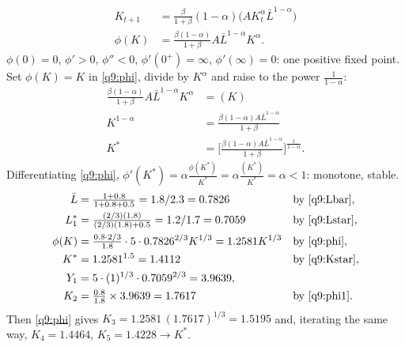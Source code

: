 \begin{sol}
\begin{align}
K_{t+1} &= \frac{\beta}{1+\beta}(1-\alpha)\big(AK_t^\alpha\bar L^{1-\alpha}\big)\nonumber\\
\phi(K) &= \frac{\beta(1-\alpha)}{1+\beta}A\bar L^{1-\alpha}K^\alpha. \label{q9:phi}
\end{align}
$\phi(0)=0$, $\phi'>0$, $\phi''<0$, $\phi'(0^+)=\infty$, $\phi'(\infty)=0$: one positive fixed point. Set $\phi(K)=K$ in \eqref{q9:phi}, divide
by $K^\alpha$ and raise to the power $\frac1{1-\alpha}$:
\begin{align}
\frac{\beta(1-\alpha)}{1+\beta}A\bar L^{1-\alpha}K^\alpha &= (K)\nonumber\\
K^{1-\alpha} &= \frac{\beta(1-\alpha)A\bar L^{1-\alpha}}{1+\beta}\nonumber\\
K^\ast &= \Big[\frac{\beta(1-\alpha)A\bar L^{1-\alpha}}{1+\beta}\Big]^{\frac1{1-\alpha}}. \label{q9:Kstar}
\end{align}
Differentiating \eqref{q9:phi}, $\phi'(K^\ast)=\alpha\frac{\phi(K^\ast)}{K^\ast}=\alpha\frac{(K^\ast)}{K^\ast}=\alpha<1$: monotone, stable.
\begin{align*}
\bar L &= \tfrac{1+0.8}{1+0.8+0.5}=1.8/2.3=0.7826 &&\text{by \eqref{q9:Lbar}},\\
L_1^\ast &= \tfrac{(2/3)(1.8)}{(2/3)(1.8)+0.5}=1.2/1.7=0.7059 &&\text{by \eqref{q9:Lstar}},\\
\phi(K) &= \tfrac{0.8\cdot2/3}{1.8}\cdot5\cdot0.7826^{2/3}K^{1/3}=1.2581K^{1/3} &&\text{by \eqref{q9:phi}},\\
K^\ast &= 1.2581^{1.5}=1.4112 &&\text{by \eqref{q9:Kstar}},\\
Y_1 &= 5\cdot(1)^{1/3}\cdot0.7059^{2/3}=3.9639,\\
K_2 &= \tfrac{0.8}{1.8}\times3.9639=1.7617 &&\text{by \eqref{q9:phi1}}.
\end{align*}
Then \eqref{q9:phi} gives $K_3=1.2581\,(1.7617)^{1/3}=1.5195$ and, iterating the same way, $K_4=1.4464$, $K_5=1.4228\to K^\ast$.
\begin{center}
\end{center}
\end{sol}
